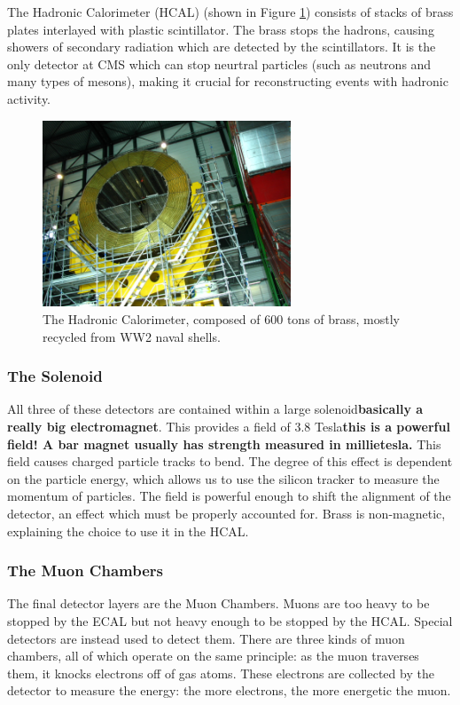 The Hadronic Calorimeter (HCAL) (shown in Figure \ref{Fig:CMS:Hadronic}) consists of stacks of brass plates interlayed with plastic scintillator. The brass stops the hadrons, causing showers of secondary radiation which are detected by the scintillators. It is the only detector at CMS which can stop neurtral particles (such as neutrons and many types of mesons), making it crucial for reconstructing events with hadronic activity.
\begin{figure}[h!]
    \centering
        \includegraphics[width=0.66\textwidth]{F3/hcal}
        \caption{The Hadronic Calorimeter, composed of 600 tons of brass, mostly recycled from WW2 naval shells.}
        \label{Fig:CMS:Hadronic}
\end{figure}
\subsubsection{The Solenoid}
All three of these detectors are contained within a large solenoid\textbf{basically a really big electromagnet}. This provides a field of 3.8 Tesla\textbf{this is a powerful field! A bar magnet usually has strength measured in millietesla.} This field causes charged particle tracks to bend. The degree of this effect is dependent on the particle energy, which allows us to use the silicon tracker to measure the momentum of particles. The field is powerful enough to shift the alignment of the detector, an effect which must be properly accounted for. Brass is non-magnetic, explaining the choice to use it in the HCAL. 
\subsubsection{The Muon Chambers}
The final detector layers are the Muon Chambers. Muons are too heavy to be stopped by the ECAL but not heavy enough to be stopped by the HCAL. Special detectors are instead used to detect them. There are three kinds of muon chambers, all of which operate on the same principle: as the muon traverses them, it knocks electrons off of gas atoms. These electrons are collected by the detector to measure the energy: the more electrons, the more energetic the muon.
